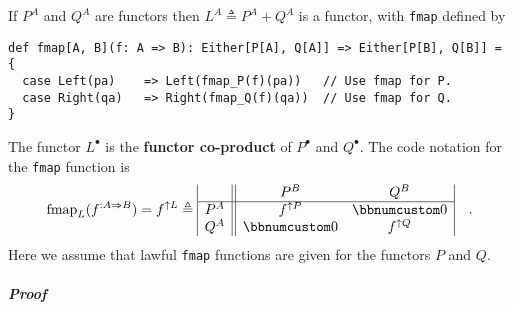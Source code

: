 If $P^{A}$ and $Q^{A}$ are functors then $L^{A}\triangleq P^{A}+Q^{A}$
is a functor, with \lstinline!fmap! defined by
\begin{lstlisting}
def fmap[A, B](f: A => B): Either[P[A], Q[A]] => Either[P[B], Q[B]] = {
  case Left(pa)    => Left(fmap_P(f)(pa))   // Use fmap for P.
  case Right(qa)   => Right(fmap_Q(f)(qa))  // Use fmap for Q.
}
\end{lstlisting}
The functor $L^{\bullet}$ is the \textbf{functor co-product}
of $P^{\bullet}$ and $Q^{\bullet}$. The code notation for the \lstinline!fmap!
function is
\[
\text{fmap}_{L}(f^{:A\Rightarrow B})=f^{\uparrow L}\triangleq\begin{array}{|c||cc|}
 & P^{B} & Q^{B}\\
\hline P^{A} & f^{\uparrow P} & \bbnum 0\\
Q^{A} & \bbnum 0 & f^{\uparrow Q}
\end{array}\quad.
\]
Here we assume that lawful \lstinline!fmap! functions are given for
the functors $P$ and $Q$.

\subparagraph{Proof}

